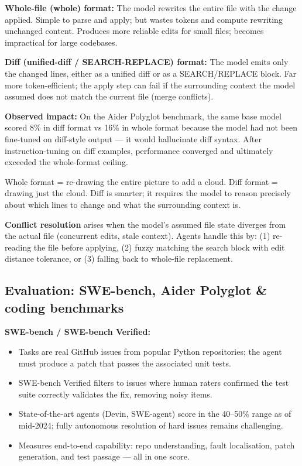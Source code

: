 \textbf{Whole-file (whole) format:}
The model rewrites the entire file with the change applied. Simple to parse and apply;
but wastes tokens and compute rewriting unchanged content. Produces more reliable edits
for small files; becomes impractical for large codebases.

\textbf{Diff (unified-diff / SEARCH-REPLACE) format:}
The model emits only the changed lines, either as a unified diff or as a
SEARCH/REPLACE block. Far more token-efficient; the apply step can fail if the
surrounding context the model assumed does not match the current file (merge
conflicts).

\textbf{Observed impact:} On the Aider Polyglot benchmark, the same base model
scored 8\% in diff format vs 16\% in whole format because the model had not been
fine-tuned on diff-style output --- it would hallucinate diff syntax. After
instruction-tuning on diff examples, performance converged and ultimately exceeded
the whole-format ceiling.

\begin{intuitionbox}[title=The analogy]
  Whole format = re-drawing the entire picture to add a cloud.
  Diff format = drawing just the cloud. Diff is smarter; it requires the model to
  reason precisely about which lines to change and what the surrounding context is.
\end{intuitionbox}

\textbf{Conflict resolution} arises when the model's assumed file state diverges from
the actual file (concurrent edits, stale context). Agents handle this by: (1) re-reading
the file before applying, (2) fuzzy matching the search block with edit distance
tolerance, or (3) falling back to whole-file replacement.

\subsection{Evaluation: SWE-bench, Aider Polyglot \& coding benchmarks}

\textbf{SWE-bench / SWE-bench Verified:}
\begin{itemize}
  \item Tasks are real GitHub issues from popular Python repositories; the agent must
    produce a patch that passes the associated unit tests.
  \item SWE-bench Verified filters to issues where human raters confirmed the test suite
    correctly validates the fix, removing noisy items.
  \item State-of-the-art agents (Devin, SWE-agent) score in the 40--50\% range as of
    mid-2024; fully autonomous resolution of hard issues remains challenging.
  \item Measures end-to-end capability: repo understanding, fault localisation,
    patch generation, and test passage --- all in one score.
\end{itemize}

